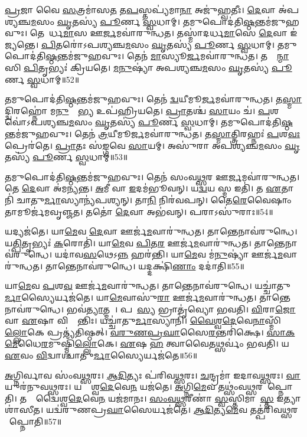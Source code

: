\ul{𑌪𑍍𑌰}𑌜𑌾 𑌵𑍈 \ul{𑌸}𑌤𑍍𑌰𑌮𑌾॑𑌸\ul{𑌤} 𑌤\ul{𑌪}𑌸𑍍𑌤𑌪𑍍𑌯॑𑌮𑌾\ul{𑌨𑌾} 𑌅𑌜𑍁॑𑌹𑍍𑌵𑌤𑍀𑌃।
\ul{𑌦𑍇}𑌵𑌾 𑌅॑𑌪𑌶𑍍𑌯𑌞𑍍𑌚\ul{𑌮}𑌸𑌂 \ul{𑌘𑍃}𑌤𑌸𑍍𑌯॑ \ul{𑌪𑍂}𑌰𑍍𑌣 \ul{𑌸𑍍𑌵}𑌧𑌾𑌮𑍍।
𑌤𑌮𑍁𑌪𑍋𑌦॑𑌤𑌿\ul{𑌷𑍍𑌠}𑌨𑍍𑌤𑌮॑\-𑌜𑍁𑌹𑌵𑍁𑌃।
𑌤𑍇𑌨𑌾᳚𑌰𑍍𑌧\ul{𑌮𑌾}𑌸 𑌊\ul{𑌰𑍍𑌜}𑌮𑌵𑌾॑𑌰𑍁𑌨𑍍𑌧𑌤।
𑌤𑌸𑍍𑌮𑌾॑𑌦𑌰𑍍𑌧\ul{𑌮𑌾}𑌸𑍇 \ul{𑌦𑍇}𑌵𑌾 𑌇॑𑌜𑍍𑌯𑌨𑍍𑌤𑍇।
\ul{𑌪𑌿}𑌤𑌰𑍋॑\-𑌽𑌪𑌶𑍍𑌯𑌞𑍍𑌚\ul{𑌮}𑌸𑌂 \ul{𑌘𑍃}𑌤𑌸𑍍𑌯॑ \ul{𑌪𑍂}𑌰𑍍𑌣 \ul{𑌸𑍍𑌵}𑌧𑌾𑌮𑍍।
𑌤𑌮𑍁𑌪𑍋𑌦॑𑌤𑌿\ul{𑌷𑍍𑌠}𑌨𑍍𑌤𑌮॑𑌜𑍁𑌹𑌵𑍁𑌃।
𑌤𑍇𑌨॑ \ul{𑌮𑌾}𑌸𑍍𑌯𑍂\ul{𑌰𑍍𑌜}𑌮𑌵𑌾॑𑌰𑍁𑌨𑍍𑌧𑌤।
𑌤𑌸𑍍𑌮𑌾᳚\ul{𑌨𑍍𑌮𑌾}𑌸𑌿 \ul{𑌪𑌿}𑌤𑍃𑌭𑍍𑌯𑌃॑ 𑌕𑍍𑌰𑌿𑌯𑌤𑍇।
\ul{𑌮}\ul{𑌨𑍁}𑌷𑍍𑌯𑌾॑ 𑌅𑌪𑌶𑍍𑌯𑌞𑍍𑌚\ul{𑌮}𑌸𑌂 \ul{𑌘𑍃}𑌤𑌸𑍍𑌯॑ \ul{𑌪𑍂}𑌰𑍍𑌣 \ul{𑌸𑍍𑌵}𑌧𑌾𑌮𑍍॥52॥

𑌤𑌮𑍁𑌪𑍋𑌦॑𑌤𑌿\ul{𑌷𑍍𑌠}𑌨𑍍𑌤𑌮॑𑌜𑍁𑌹𑌵𑍁𑌃।
𑌤𑍇𑌨॑ \ul{𑌦𑍍𑌵}𑌯𑍀𑌮𑍂\ul{𑌰𑍍𑌜}𑌮𑌵𑌾॑𑌰𑍁𑌨𑍍𑌧𑌤।
𑌤\ul{𑌸𑍍𑌮𑌾}𑌦𑍍𑌦𑍍𑌵𑌿𑌰𑌹𑍍𑌨𑍋॑ 𑌮\ul{𑌨𑍁}𑌷𑍍𑌯𑍇᳚\ul{𑌭𑍍𑌯} 𑌉𑌪॑𑌹𑍍𑌰𑌿𑌯𑌤𑍇।
\ul{𑌪𑍍𑌰𑌾}𑌤𑌶𑍍𑌚॑ \ul{𑌸𑌾}𑌯𑌂 𑌚॑।
\ul{𑌪}𑌶𑌵𑍋॑\-𑌽𑌪𑌶𑍍𑌯𑌞𑍍𑌚\ul{𑌮}𑌸𑌂 \ul{𑌘𑍃}𑌤𑌸𑍍𑌯॑ \ul{𑌪𑍂}𑌰𑍍𑌣 \ul{𑌸𑍍𑌵}𑌧𑌾𑌮𑍍।
𑌤𑌮𑍁𑌪𑍋𑌦॑𑌤𑌿\ul{𑌷𑍍𑌠}𑌨𑍍𑌤\-𑌮॑𑌜𑍁𑌹𑌵𑍁𑌃।
𑌤𑍇𑌨॑ \ul{𑌤𑍍𑌰}𑌯𑍀𑌮𑍂\ul{𑌰𑍍𑌜}𑌮𑌵𑌾॑𑌰𑍁𑌨𑍍𑌧𑌤।
𑌤\ul{𑌸𑍍𑌮𑌾}𑌤𑍍𑌤𑍍𑌰𑌿𑌰𑌹𑍍𑌨𑌃॑ \ul{𑌪}𑌶\ul{𑌵𑌃} 𑌪𑍍𑌰𑍇𑌰॑𑌤𑍇।
\ul{𑌪𑍍𑌰𑌾}𑌤𑌃 𑌸॑\ul{𑌙𑍍𑌗}𑌵𑍇 \ul{𑌸𑌾}𑌯𑌮𑍍।
𑌅𑌸𑍁॑𑌰𑌾 𑌅𑌪𑌶𑍍𑌯𑌞𑍍𑌚\ul{𑌮}𑌸𑌂 \ul{𑌘𑍃}𑌤𑌸𑍍𑌯॑ \ul{𑌪𑍂}𑌰𑍍𑌣 \ul{𑌸𑍍𑌵}𑌧𑌾𑌮𑍍॥53॥

𑌤𑌮𑍁𑌪𑍋𑌦॑𑌤𑌿\ul{𑌷𑍍𑌠}𑌨𑍍𑌤𑌮॑𑌜𑍁𑌹𑌵𑍁𑌃।
𑌤𑍇𑌨॑ 𑌸𑌂𑌵\ul{𑌥𑍍𑌸}𑌰 𑌊\ul{𑌰𑍍𑌜}𑌮𑌵𑌾॑𑌰𑍁𑌨𑍍𑌧𑌤।
𑌤𑍇 \ul{𑌦𑍇}𑌵𑌾 𑌅॑𑌮𑌨𑍍𑌯𑌨𑍍𑌤।
\ul{𑌅}𑌮𑍀 𑌵𑌾 \ul{𑌇}𑌦𑌮॑𑌭𑍂𑌵𑌨𑍍।
𑌯\ul{𑌦𑍍𑌵}𑌯 𑌸𑍍𑌮 𑌇𑌤𑌿॑।
𑌤 \ul{𑌏}𑌤𑌾𑌨𑌿॑ 𑌚𑌾𑌤𑍁\ul{𑌰𑍍𑌮𑌾}𑌸𑍍𑌯𑌾𑌨𑍍𑌯॑𑌪𑌶𑍍𑌯𑌨𑍍।
𑌤𑌾\ul{𑌨𑌿} 𑌨𑌿𑌰॑𑌵𑌪𑌨𑍍।
𑌤𑍈\ul{𑌰𑍇}𑌵𑍈𑌷𑌾𑌂 𑌤𑌾𑌮𑍂𑌰𑍍𑌜॑𑌮𑌵𑍃𑌞𑍍𑌜𑌤।
𑌤𑌤𑍋॑ \ul{𑌦𑍇}𑌵𑌾 𑌅𑌭॑𑌵𑌨𑍍।
𑌪𑌰𑌾𑌽𑌸𑍁॑𑌰𑌾𑌃॥54॥

𑌯𑌦𑍍𑌯𑌜॑𑌤𑍇।
𑌯𑌾\ul{𑌮𑍇}𑌵 \ul{𑌦𑍇}𑌵𑌾 𑌊𑌰𑍍𑌜॑\ul{𑌮}𑌵𑌾𑌰𑍁॑𑌨𑍍𑌧𑌤।
𑌤𑌾𑌨𑍍𑌤𑍇𑌨𑌾𑌵॑𑌰𑍁𑌨𑍍𑌧𑍇।
𑌯\ul{𑌤𑍍𑌪𑌿}𑌤𑍃𑌭𑍍𑌯𑌃॑ \ul{𑌕}𑌰𑍋𑌤𑌿॑।
𑌯𑌾\ul{𑌮𑍇}𑌵 \ul{𑌪𑌿}𑌤\ul{𑌰} 𑌊𑌰𑍍𑌜॑\ul{𑌮}𑌵𑌾𑌰𑍁॑𑌨𑍍𑌧𑌤।
𑌤𑌾𑌨𑍍𑌤𑍇𑌨𑌾𑌵॑𑌰𑍁𑌨𑍍𑌧𑍇।
𑌯𑌦𑌾॑𑌵\ul{𑌸}𑌥𑍇\-𑌽\ul{𑌨𑍍𑌨}\ul{} 𑌹𑌰॑𑌨𑍍𑌤𑌿।
𑌯𑌾\ul{𑌮𑍇}𑌵 𑌮॑\ul{𑌨𑍁}𑌷𑍍𑌯𑌾॑ 𑌊𑌰𑍍𑌜॑\ul{𑌮}𑌵𑌾𑌰𑍁॑𑌨𑍍𑌧𑌤।
𑌤𑌾𑌨𑍍𑌤𑍇𑌨𑌾𑌵॑𑌰𑍁𑌨𑍍𑌧𑍇।
𑌯𑌦𑍍𑌦𑌕𑍍𑌷𑌿॑\ul{𑌣𑌾𑌂} 𑌦𑌦𑌾॑𑌤𑌿॥55॥

𑌯𑌾\ul{𑌮𑍇}𑌵 \ul{𑌪}𑌶\ul{𑌵} 𑌊𑌰𑍍𑌜॑\ul{𑌮}𑌵𑌾𑌰𑍁॑𑌨𑍍𑌧𑌤।
𑌤𑌾𑌨𑍍𑌤𑍇𑌨𑌾𑌵॑𑌰𑍁𑌨𑍍𑌧𑍇।
𑌯𑌚𑍍𑌚𑌾॑𑌤𑍁\ul{𑌰𑍍𑌮𑌾}𑌸𑍍𑌯𑍈𑌰𑍍\-𑌯𑌜॑𑌤𑍇।
𑌯𑌾\ul{𑌮𑍇}𑌵𑌾𑌸𑍁॑\ul{𑌰𑌾} 𑌊𑌰𑍍𑌜॑\ul{𑌮}𑌵𑌾𑌰𑍁॑𑌨𑍍𑌧𑌤।
𑌤𑌾𑌨𑍍𑌤𑍇𑌨𑌾𑌵॑𑌰𑍁𑌨𑍍𑌧𑍇।
𑌭𑌵॑\ul{𑌤𑍍𑌯𑌾}𑌤𑍍𑌮𑌨𑌾᳚।
𑌪𑌰𑌾᳚\ul{𑌸𑍍𑌯} 𑌭𑍍𑌰𑌾𑌤𑍃॑𑌵𑍍𑌯𑍋 𑌭𑌵𑌤𑌿।
\ul{𑌵𑌿}𑌰𑌾\ul{𑌜𑍋} 𑌵𑌾 \ul{𑌏}𑌷𑌾 𑌵𑌿𑌕𑍍𑌰𑌾᳚𑌨𑍍𑌤𑌿𑌃।
𑌯𑌚𑍍𑌚𑌾॑𑌤𑍁\ul{𑌰𑍍𑌮𑌾}𑌸𑍍𑌯𑌾𑌨𑌿॑।
\ul{𑌵𑍈}\ul{𑌶𑍍𑌵}\ul{𑌦𑍇}𑌵𑍇\ul{𑌨𑌾}𑌸𑍍𑌮𑌿𑌁\ul{𑌲𑍍𑌲𑍋}𑌕𑍇 𑌪𑍍𑌰𑌤𑍍𑌯॑𑌤𑌿𑌷𑍍𑌠𑌤𑍍।
\ul{𑌵}\ul{𑌰𑍁}\ul{𑌣}\ul{𑌪𑍍𑌰}\ul{𑌘𑌾}𑌸𑍈\ul{𑌰}𑌨𑍍𑌤𑌰𑌿॑𑌕𑍍𑌷𑍇।
\ul{𑌸𑌾}\ul{𑌕}\ul{𑌮𑍇}𑌧𑍈\ul{𑌰}𑌮𑍁𑌷𑍍𑌮𑌿𑌁॑\ul{𑌲𑍍𑌲𑍋}𑌕𑍇।
\ul{𑌏}𑌷 \ul{𑌹} 𑌤𑍍𑌵𑌾𑌵𑍈𑌤𑌥𑍍𑌸𑌰𑍍𑌵𑌂॑ 𑌭𑌵𑌤𑌿।
𑌯 \ul{𑌏}𑌵𑌂 \ul{𑌵𑌿}𑌦𑍍𑌵𑌾𑌶𑍍𑌚𑌾॑𑌤𑍁\ul{𑌰𑍍𑌮𑌾}𑌸𑍍𑌯𑍈𑌰𑍍𑌯𑌜॑𑌤𑍇॥56॥

\ul{𑌅}𑌗𑍍𑌨𑌿𑌰𑍍𑌵𑌾𑌵 𑌸𑌂॑𑌵\ul{𑌥𑍍𑌸}𑌰𑌃।
\ul{𑌆}\ul{𑌦𑌿}𑌤𑍍𑌯𑌃 𑌪॑𑌰𑌿𑌵\ul{𑌥𑍍𑌸}𑌰𑌃।
\ul{𑌚}𑌨𑍍𑌦𑍍𑌰𑌮𑌾॑ 𑌇𑌦𑌾𑌵\ul{𑌥𑍍𑌸}𑌰𑌃।
\ul{𑌵𑌾}𑌯𑍁𑌰॑𑌨𑍁𑌵\ul{𑌥𑍍𑌸}𑌰𑌃।
𑌯𑌦𑍍𑌵𑍈᳚𑌶𑍍𑌵\ul{𑌦𑍇}𑌵𑍇\ul{𑌨} 𑌯𑌜॑𑌤𑍇।
\ul{𑌅}𑌗𑍍𑌨𑌿\ul{𑌮𑍇}𑌵 𑌤𑌥𑍍𑌸𑌂॑𑌵\ul{𑌥𑍍𑌸}𑌰𑌮𑌾᳚𑌪𑍍𑌨𑍋𑌤𑌿।
𑌤𑌸𑍍𑌮𑌾᳚𑌦𑍍𑌵𑍈𑌶𑍍𑌵\ul{𑌦𑍇}𑌵𑍇\ul{𑌨} 𑌯𑌜॑𑌮𑌾𑌨𑌃।
\ul{𑌸𑌂}\ul{𑌵}\ul{𑌥𑍍𑌸}𑌰𑍀𑌣𑌾॑ \ul{𑌸𑍍𑌵}𑌸𑍍𑌤𑌿𑌮𑌾𑌶𑌾᳚\ul{𑌸𑍍𑌤} 𑌇𑌤𑍍𑌯𑌾𑌶𑌾॑𑌸𑍀𑌤।
𑌯𑌦𑍍𑌵॑𑌰𑍁𑌣\-𑌪𑍍𑌰\ul{𑌘𑌾}𑌸𑍈𑌰𑍍𑌯𑌜॑𑌤𑍇।
\ul{𑌆}\ul{𑌦𑌿}𑌤𑍍𑌯\ul{𑌮𑍇}𑌵 𑌤𑌤𑍍𑌪॑𑌰𑌿𑌵\ul{𑌥𑍍𑌸}𑌰𑌮𑌾᳚𑌪𑍍𑌨𑍋𑌤𑌿॥57॥


